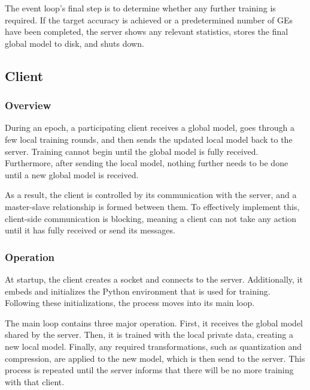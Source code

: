 The event loop's final step is to determine whether any further training is required. If the target accuracy is achieved or a predetermined number of GEs have been completed, the server shows any relevant statistics, stores the final global model to disk, and shuts down.


\subsection{Client}
\subsubsection{Overview}
During an epoch, a participating client receives a global model, goes through a few local training rounds, and then sends the updated local model back to the server. Training cannot begin until the global model is fully received. Furthermore, after sending the local model, nothing further needs to be done until a new global model is received.

As a result, the client is controlled by its communication with the server, and a master-slave relationship is formed between them. To effectively implement this, client-side communication is blocking, meaning a client can not take any action until it has fully received or send its messages.

\subsubsection{Operation}
At startup, the client creates a socket and connects to the server. Additionally, it embeds and initializes the Python environment that is used for training.  Following these initializations, the process moves into its main loop.

The main loop contains three major operation. First, it receives the global model shared by the server. Then, it is trained with the local private data, creating a new local model. Finally, any required transformations, such as quantization and compression, are applied to the new model, which is then send to the server. This process is repeated until the server informs that there will be no more training with that client.

